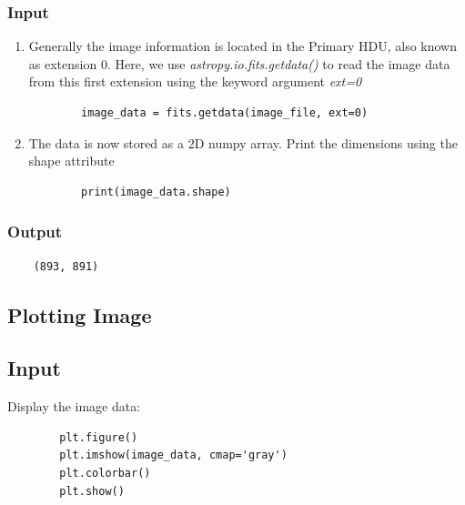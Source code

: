 \documentclass[letterpaper,11pt]{report}
\begin{document}
\subsubsection{Input}

\begin{enumerate}
    \item Generally the image information is located in the Primary HDU, also known as extension 0. Here, we
    use \emph{astropy.io.fits.getdata()} to read the image data from this first extension using the keyword
    argument \emph{ext=0}
        \begin{lstlisting}
        image_data = fits.getdata(image_file, ext=0)
        \end{lstlisting}
    \item The data is now stored as a 2D numpy array. Print the dimensions using the shape attribute
        \begin{lstlisting}
        print(image_data.shape)
        \end{lstlisting}
\end{enumerate}

\subsubsection{Output}
\begin{lstlisting}
    (893, 891)
\end{lstlisting}

\subsection{Plotting Image}
\subsection{Input}
Display the image data:
    \begin{lstlisting}
        plt.figure()
        plt.imshow(image_data, cmap='gray')
        plt.colorbar()
        plt.show()
    \end{lstlisting}
    
    
\end{document}
